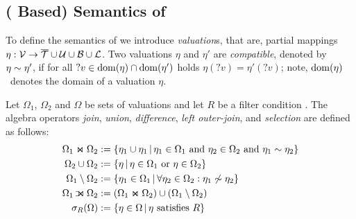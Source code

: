 \subsection{({\RDFplus} Based) Semantics of {\SPARQLplus}}
	To define the semantics of {\SPARQLplus} we introduce
\emph{valuation}s, that are, partial mappings $\eta : \mathcal{V} \rightarrow \overline{\mathcal{T}} \cup \mathcal{U} \cup \mathcal{B} \cup \mathcal{L}$.
Two valuations $\eta$ and $\eta'$ are \emph{compatible}, denoted by $\eta \sim \eta'$, if for all $?v \in \mathrm{dom}(\eta) \cap \mathrm{dom}(\eta')$ holds $\eta(?v) = \eta'(?v)$; note,
	$\mathrm{dom}(\eta)$~denotes %
the domain of a valuation $\eta$.

Let $\Omega_1$, $\Omega_2$ and $\Omega$ be sets of
	valuations and let
$R$ be a filter condition%
	.
The algebra operators \emph{join}, \emph{union}, \emph{difference}, \emph{left outer-join},
	and \emph{selection}
are defined as follows:
\begin{align*}
	\Omega_1 \Join \Omega_2 & := \lbrace \eta_1 \cup \eta_1 \,|\, \eta_1 \in \Omega_1 \text{ and } \eta_2 \in \Omega_2 \text{ and } \eta_1 \sim \eta_2 \rbrace
	\\
	\Omega_2 \cup \Omega_2 & := \lbrace \eta \,|\, \eta \in \Omega_1 \text{ or } \eta \in \Omega_2 \rbrace
	\\
	\Omega_1 \setminus \Omega_2 & := \lbrace \eta_1 \in \Omega_1 \,|\, \forall \eta_2 \in \Omega_2 : \eta_1 \not\sim \eta_2 \rbrace
	\\
	\Omega_1 \LJoin \Omega_2 &:= \left( \Omega_1 \Join \Omega_2 \right) \cup \left( \Omega_1 \setminus \Omega_2 \right)
	\\
	\sigma_R ( \Omega ) &:= \lbrace \eta \in \Omega \,|\, \eta \text{ satisfies } R \rbrace
\end{align*}

